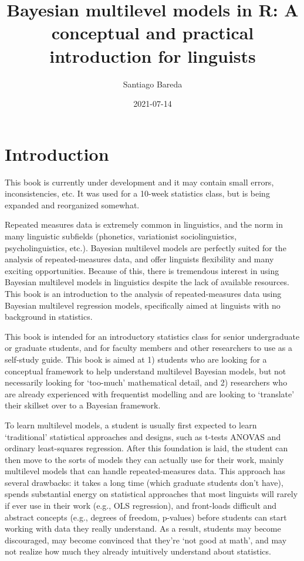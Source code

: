 \documentclass[
]{book}
\title{Bayesian multilevel models in R: A conceptual and practical introduction for linguists}
\author{Santiago Bareda}
\date{2021-07-14}
\begin{document}
\maketitle

{
\setcounter{tocdepth}{1}
\tableofcontents
}
\hypertarget{introduction}{%
\chapter*{Introduction}\label{introduction}}

This book is currently under development and it may contain small errors, inconsistencies, etc. It was used for a 10-week statistics class, but is being expanded and reorganized somewhat.

Repeated measures data is extremely common in linguistics, and the norm in many linguistic subfields (phonetics, variationist sociolinguistics, psycholinguistics, etc.). Bayesian multilevel models are perfectly suited for the analysis of repeated-measures data, and offer linguists flexibility and many exciting opportunities. Because of this, there is tremendous interest in using Bayesian multilevel models in linguistics despite the lack of available resources. This book is an introduction to the analysis of repeated-measures data using Bayesian multilevel regression models, specifically aimed at linguists with no background in statistics.

This book is intended for an introductory statistics class for senior undergraduate or graduate students, and for faculty members and other researchers to use as a self-study guide. This book is aimed at 1) students who are looking for a conceptual framework to help understand multilevel Bayesian models, but not necessarily looking for `too-much' mathematical detail, and 2) researchers who are already experienced with frequentist modelling and are looking to `translate' their skillset over to a Bayesian framework.

To learn multilevel models, a student is usually first expected to learn `traditional' statistical approaches and designs, such as t-tests ANOVAS and ordinary least-squares regression. After this foundation is laid, the student can then move to the sorts of models they can actually use for their work, mainly multilevel models that can handle repeated-measures data. This approach has several drawbacks: it takes a long time (which graduate students don't have), spends substantial energy on statistical approaches that most linguists will rarely if ever use in their work (e.g., OLS regression), and front-loads difficult and abstract concepts (e.g., degrees of freedom, p-values) before students can start working with data they really understand. As a result, students may become discouraged, may become convinced that they're `not good at math', and may not realize how much they already intuitively understand about statistics.
\end{document}
